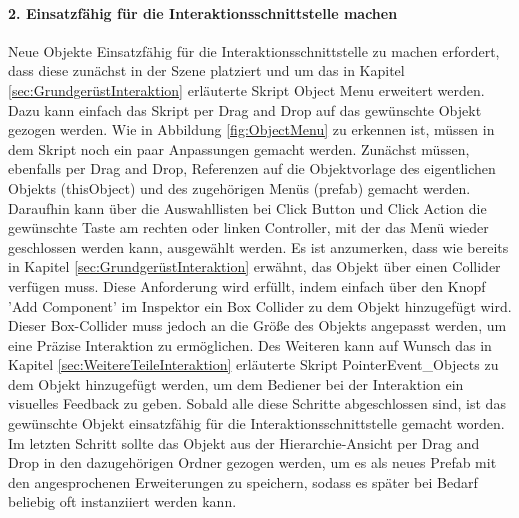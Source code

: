 \paragraph{2. Einsatzfähig für die Interaktionsschnittstelle machen}
\noindent Neue Objekte Einsatzfähig für die Interaktionsschnittstelle zu machen erfordert, dass diese zunächst in der Szene platziert und um das in Kapitel \ref{sec:GrundgerüstInteraktion} erläuterte Skript Object Menu erweitert werden. Dazu kann einfach das Skript per Drag and Drop auf das gewünschte Objekt gezogen werden. Wie in Abbildung \ref{fig:ObjectMenu} zu erkennen ist, müssen in dem Skript noch ein paar Anpassungen gemacht werden. Zunächst müssen, ebenfalls per Drag and Drop, Referenzen auf die Objektvorlage des eigentlichen Objekts (thisObject) und des zugehörigen Menüs (prefab) gemacht werden. Daraufhin kann über die Auswahllisten bei Click Button und Click Action die gewünschte Taste am rechten oder linken Controller, mit der das Menü wieder geschlossen werden kann, ausgewählt werden. Es ist anzumerken, dass wie bereits in Kapitel \ref{sec:GrundgerüstInteraktion} erwähnt, das Objekt über einen Collider verfügen muss. Diese Anforderung wird erfüllt, indem einfach über den Knopf 'Add Component' im Inspektor ein Box Collider zu dem Objekt hinzugefügt wird. Dieser Box-Collider muss jedoch an die Größe des Objekts angepasst werden, um eine Präzise Interaktion zu ermöglichen. Des Weiteren kann auf Wunsch das in Kapitel \ref{sec:WeitereTeileInteraktion} erläuterte Skript PointerEvent\_Objects zu dem Objekt hinzugefügt werden, um dem Bediener bei der Interaktion ein visuelles Feedback zu geben. Sobald alle diese Schritte abgeschlossen sind, ist das gewünschte Objekt einsatzfähig für die Interaktionsschnittstelle gemacht worden. Im letzten Schritt sollte das Objekt aus der Hierarchie-Ansicht per Drag and Drop in den dazugehörigen Ordner gezogen werden, um es als neues Prefab mit den angesprochenen Erweiterungen zu speichern, sodass es später bei Bedarf beliebig oft instanziiert werden kann.

